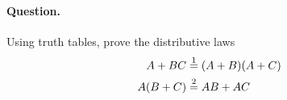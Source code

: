 \paragraph{Question.} Using truth tables, prove the distributive laws
\begin{align*}
A + BC &\stackrel{1}{=} (A + B)(A + C)\\ A (B+C) &\stackrel{2}{=} AB + AC
\end{align*}
